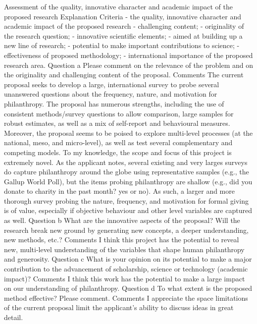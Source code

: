 \documentclass[twocolumn, serif, rga, numeric]{jote-article}
\begin{document}
Assessment of the quality, innovative character and academic impact of the proposed research
Explanation
Criteria - the quality, innovative character and academic impact of the proposed research - challenging content; - originality of the research question; - innovative scientific elements; - aimed at building up a new line of research; - potential to make important contributions to science; - effectiveness of proposed methodology; - international importance of the proposed research area.
Question a
Please comment on the relevance of the problem and on the originality and challenging content of the proposal.
Comments
The current proposal seeks to develop a large, international survey to probe several unanswered questions about the frequency, nature, and motivation for philanthropy. The proposal has numerous strengths, including the use of consistent methods/survey questions to allow comparison, large samples for robust estimates, as well as a mix of self-report and behavioural measures. Moreover, the proposal seems to be poised to explore multi-level processes (at the national, meso, and micro-level), as well as test several complementary and competing models.
To my knowledge, the scope and focus of this project is extremely novel. As the applicant notes, several existing and very larges surveys do capture philanthropy around the globe using representative samples (e.g., the Gallup World Poll), but the items probing philanthropy are shallow (e.g., did you donate to charity in the past month? yes or no). As such, a larger and more thorough survey probing the nature, frequency, and motivation for formal giving is of value, especially if objective behaviour and other level variables are captured as well.
Question b
What are the innovative aspects of the proposal? Will the research break new ground by generating new concepts, a deeper understanding, new methods, etc.?
Comments
I think this project has the potential to reveal new, multi-level understanding of the variables that shape human philanthropy and generosity.
Question c
What is your opinion on its potential to make a major contribution to the advancement of scholarship, science or technology (academic impact)?
Comments
I think this work has the potential to make a large impact on our understanding of philanthropy.
Question d
To what extent is the proposed method effective? Please comment.
Comments
I appreciate the space limitations of the current proposal limit the applicant's ability to discuss ideas in great detail.
\end{document}
